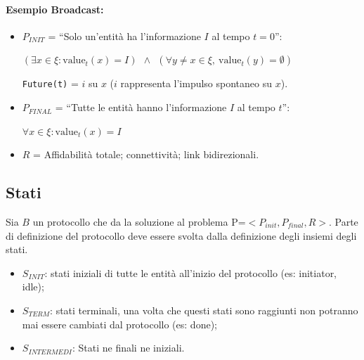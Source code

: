 
\paragraph{Esempio Broadcast:}
\begin{itemize}
    \item $P_{INIT}$ = ``Solo un'entità ha l'informazione $I$ al tempo $t=0$'':
          \begin{center}
              $(\exists x \in \xi : \textrm{value}_t(x) = I) ~~ \wedge ~~ (\forall
                  y \neq x \in \xi,~\textrm{value}_t(y) = \emptyset)$
          \end{center}

          \texttt{Future(t)} = $i$ su $x$ ($i$ rappresenta l'impulso spontaneo
          su $x$).

    \item $P_{FINAL}$ = ``Tutte le entità hanno l'informazione $I$ al tempo
          $t$'':
          \begin{center}
              $\forall x \in \xi : \textrm{value}_t(x) = I$
          \end{center}

    \item $R$ = Affidabilità totale; connettività; link bidirezionali.
\end{itemize}

\subsection{Stati}
Sia $B$ un protocollo che da la soluzione al problema P=$<P_{init}, P_{final},
    R>$. Parte di definizione del protocollo deve essere svolta dalla definizione
degli insiemi degli stati.
\begin{itemize}
    \item $S_{INIT}$: stati iniziali di tutte le entità all'inizio del protocollo
          (es: initiator, idle);
    \item $S_{TERM}$: stati terminali, una volta che questi stati sono raggiunti
          non potranno mai essere cambiati dal protocollo (es: done);
    \item $S_{INTERMEDI}$: Stati ne finali ne iniziali.
\end{itemize}


